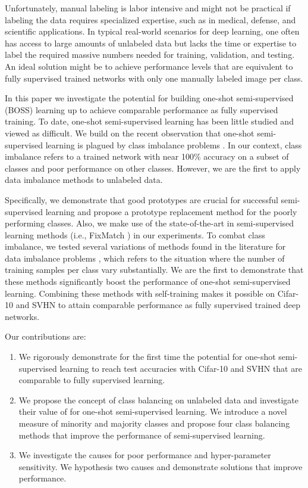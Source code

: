 \documentclass[final]{cvpr}
\newcommand{\SOTA}{state-of-the-art }
\newcommand{\OSSSL}{one-shot semi-supervised learning }
\newcommand{\OSSSLno}{one-shot semi-supervised learning}
\newcommand{\SSL}{semi-supervised learning }
\newcommand{\SSLno}{semi-supervised learning}
\begin{document}
Unfortunately, manual labeling is labor intensive and might not be practical if labeling the data requires specialized expertise, such as in medical, defense, and scientific applications.
In typical real-world scenarios for deep learning, one often has access to large amounts of unlabeled data but lacks the time or expertise to label the required massive numbers needed for training, validation, and testing. 
An ideal solution might be to achieve performance levels that are equivalent to fully supervised trained networks with only one manually labeled image per class.

In this paper we investigate the potential for building one-shot semi-supervised (BOSS) learning up to achieve comparable performance as fully supervised training.
To date, \OSSSL has been little studied and viewed as difficult.
We build on the recent observation that \OSSSL is plagued by class imbalance problems \cite{smith2020empirical}.
In our context, class imbalance refers to a trained network with near 100\% accuracy on a subset of classes and poor performance on other classes. 
However, we are the first to apply data imbalance methods to unlabeled data.

Specifically, we demonstrate that good prototypes are crucial for successful \SSL and propose a prototype replacement method for the poorly performing classes.
Also, we make use of the \SOTA in \SSL methods (i.e., FixMatch \cite{sohn2020fixmatch}) in our experiments.
To combat class imbalance, we tested several variations of methods found in the literature for data imbalance problems \cite{johnson2019survey}, which refers to the situation where the number of training samples per class vary substantially.
We are the first to demonstrate that these methods significantly boost the performance of one-shot semi-supervised learning.
Combining these methods with self-training \cite{rosenberg2005semi} makes it possible  on Cifar-10 and SVHN to attain comparable performance as fully supervised trained deep networks.




Our contributions are:
\begin{enumerate}
	\item We rigorously demonstrate for the first time the potential for \OSSSL to reach test accuracies with Cifar-10 and SVHN that are comparable to fully supervised learning.
	\item We propose the concept of class balancing on unlabeled data and investigate their value of for \OSSSLno.  We introduce a novel measure of minority and majority classes and propose four class balancing methods  that improve the performance of \SSLno.
	\item We investigate the causes for poor performance and hyper-parameter sensitivity.  We hypothesis two causes and demonstrate solutions that improve performance.
\end{enumerate}
\end{document}
